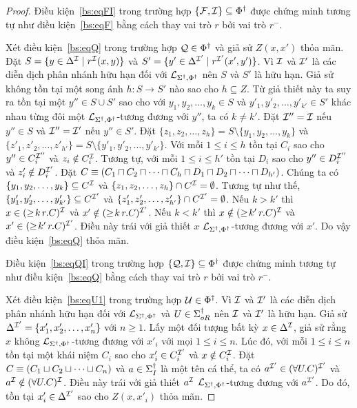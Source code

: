 \begin{proof}
	\semiItem Điều kiện~\eqref{bs:eqFI} trong trường hợp $\{\mathcal{F},\mathcal{I}\} \subseteq \Phi^\dag$ được chứng minh tương tự như điều kiện~\eqref{bs:eqF} bằng cách thay vai trò $r$ bởi vai trò $r^-$.
	
	\semiItem Xét điều kiện~\eqref{bs:eqQ} trong trường hợp $\mathcal{Q} \in \Phi^\dag$ và giả sử $Z(x,x')$ thỏa mãn. Đặt $S = \{y \in \Delta^{\mathcal{I}} \mid r^{\mathcal{I}}(x,y)\}$ và $S' = \{y' \in \Delta^{\mathcal{I}'} \mid r^{\mathcal{I}'}(x',y')\}$. Vì $\mathcal{I}$ và $\mathcal{I}'$ là các diễn dịch phân nhánh hữu hạn đối với $\mathcal{L}_{\Sigma^\dag,\Phi^\dag}$ nên $S$ và $S'$ là hữu hạn. 
	Giả sử không tồn tại một song ánh $h : S \rightarrow S'$ nào sao cho $h \subseteq Z$. Từ giả thiết này ta suy ra tồn tại một $y'' \in S \cup S'$ sao cho với $y_1, y_2, \ldots, y_k \in S$ và $y'_1, y'_2, \ldots, y'_{k'} \in S'$ khác nhau từng đôi một $\mathcal{L}_{\Sigma^\dag,\Phi^\dag}$-tương đương với $y''$, ta có $k \not= k'$. Đặt $\mathcal{I}'' = \mathcal{I}$ nếu $y'' \in S$ và $\mathcal{I}'' = \mathcal{I}'$ nếu $y'' \in S'$. Đặt $\{z_1, z_2, \ldots, z_h\} = S \setminus \{y_1, y_2, \ldots, y_k\}$ và $\{z'_1, z'_2, \ldots, z'_{h'}\} = S \setminus \{y'_1, y'_2, \ldots, y'_{k'}\}$. Với mỗi $1 \leq i \leq h$ tồn tại $C_i$ sao cho $y'' \in C_i^{\mathcal{I}''}$ và $z_i \notin C_i^{\mathcal{I}}$. Tương tự, với mỗi $1 \leq i \leq h'$ tồn tại $D_i$ sao cho $y'' \in D_i^{\mathcal{I}''}$ và $z'_i \notin D_i^{\mathcal{I}'}$. Đặt $C \equiv (C_1 \sqcap C_2 \sqcap \cdots \sqcap C_h \sqcap D_1 \sqcap D_2 \sqcap \cdots \sqcap D_{h'})$. Chúng ta có $\{y_1, y_2, \ldots, y_k\} \subseteq C^{\mathcal{I}}$ và $\{z_1, z_2, \ldots, z_h\} \cap C^{\mathcal{I}} = \emptyset$. Tương tự như thế, $\{y'_1, y'_2, \ldots, y'_{k'}\} \subseteq C^{\mathcal{I}'}$ và $\{z'_1, z'_2, \ldots, z'_{h'}\} \cap C^{\mathcal{I}'} = \emptyset$. Nếu $k > k'$ thì $x \in (\geq\!k\,r.C)^{\mathcal{I}}$ và $x' \notin (\geq\!k\,r.C)^{\mathcal{I}'}$. Nếu $k < k'$ thì $x \notin (\geq\!k'\,r.C)^{\mathcal{I}}$ và $x' \in (\geq\!k'\,r.C)^{\mathcal{I}'}$. Điều này trái với giả thiết $x$ $\mathcal{L}_{\Sigma^\dag,\Phi^\dag}$-tương đương với $x'$. Do vậy điều kiện~\eqref{bs:eqQ} thỏa mãn.
	
	\semiItem Điều kiện~\eqref{bs:eqQI} trong trường hợp $\{\mathcal{Q},\mathcal{I}\} \subseteq \Phi^\dag$ được chứng minh tương tự như điều kiện~\eqref{bs:eqQ} bằng cách thay vai trò $r$ bởi vai trò $r^-$.
	
	\semiItem Xét điều kiện~\eqref{bs:eqU1} trong trường hợp $\mathcal{U} \in \Phi^\dag$. Vì $\mathcal{I}$ và $\mathcal{I}'$ là các diễn dịch phân nhánh hữu hạn đối với $\mathcal{L}_{\Sigma^\dag,\Phi^\dag}$ và $U \in \Sigma^\dag_{oR}$ nên $\mathcal{I}$ và $\mathcal{I}'$ là hữu hạn. Giả sử $\Delta^{\mathcal{I}'} = \{x'_1, x'_2, \ldots, x'_n\}$ với $n \geq 1$. Lấy một đối tượng bất kỳ $x \in \Delta^{\mathcal{I}}$, giả sử rằng $x$ không $\mathcal{L}_{\Sigma^\dag,\Phi^\dag}$-tương đương với $x'_i$ với mọi $1 \leq i \leq n$. Lúc đó, với mỗi $1 \leq i \leq n$ tồn tại một khái niệm $C_i$ sao cho $x'_i \in C_i^{\mathcal{I}'}$ và $x \notin C_i^{\mathcal{I}}$. Đặt $C \equiv (C_1 \sqcup C_2 \sqcup \cdots \sqcup C_n)$ và $a \in \Sigma^\dag_I$ là một tên cá thể, ta có $a^{\mathcal{I}'} \in (\forall U.C)^{\mathcal{I}'}$ và $a^{\mathcal{I}} \notin (\forall U.C)^{\mathcal{I}}$. Điều này trái với giả thiết $a^{\mathcal{I}}$ $\mathcal{L}_{\Sigma^\dag,\Phi^\dag}$-tương đương với $a^{\mathcal{I}'}$. Do đó, tồn tại $x'_i \in \Delta^{\mathcal{I}'}$ sao cho $Z(x, x'_i)$ thỏa mãn.
	

\end{proof}
